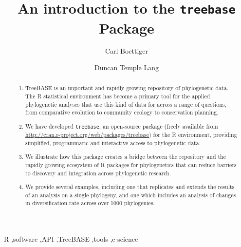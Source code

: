 \documentclass[authoryear, preprint]{elsarticle}
\begin{document}
\begin{frontmatter}
  \title{An introduction to the \texttt{treebase} Package}
  \author[davis]{Carl Boettiger}
  \author[stats]{Duncan Temple Lang}
  \address[davis]{Center for Population Biology, University of California, Davis, United States}
  \address[stats]{Department of Statistics, University of California, Davis, United States}

  \begin{abstract}
  \begin{enumerate}
  \item TreeBASE is an important and rapidly growing repository of phylogenetic data.  The R statistical environment has become a primary tool for the applied phylogenetic analyses that use this kind of data for across a range of questions, from comparative evolution to community ecology to conservation planning.  
  \item We have developed \texttt{treebase}, an open-source package (freely available from\\ \href{http://cran.r-project.org/web/packages/treebase}{http://cran.r-project.org/web/packages/treebase}) for the R environment, providing simplified, programmatic and interactive access to phylogenetic data.  
  \item We illustrate how this package creates a bridge between the repository and the rapidly growing ecosystem of R packages for phylogenetics that can reduce barriers to discovery and integration across phylogenetic research. 
  \item We provide several examples, including one that replicates and extends the results of an analysis on a single phylogeny, and one which includes an analysis of changes in diversification rate across over 1000 phylogenies.    
  \end{enumerate}

  \end{abstract}

  \begin{keyword}
   R  \sep software \sep API \sep TreeBASE \sep tools \sep e-science
   \end{keyword}
 \end{frontmatter}
\end{document}
